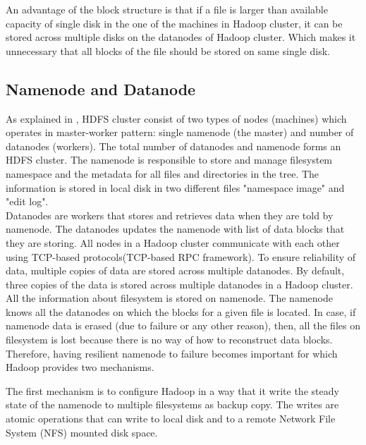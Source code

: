   An advantage of the block structure is that if a file is larger than available capacity of single disk in the one of the machines in Hadoop cluster, it can be stored across multiple disks on the datanodes of Hadoop cluster. Which makes it unnecessary that all blocks of the file should be stored on same single disk. 



\subsection{Namenode and Datanode}

 As explained in \cite{tom3}, HDFS cluster consist of two types of nodes (machines) which operates in master-worker pattern: single namenode (the master) and number of datanodes (workers). The total number of datanodes and namenode forms an HDFS cluster. The namenode is responsible to store and manage filesystem namespace and the metadata for all files and directories in the tree. The information is stored in local disk in two different files "namespace image" and "edit log".\\

  Datanodes are workers that stores and retrieves data when they are told by namenode. The datanodes updates the namenode with list of data blocks that they are storing. All nodes in a Hadoop cluster communicate with each other using TCP-based protocols(TCP-based RPC‌ framework). To ensure reliability of data, multiple copies of data are stored across multiple datanodes. By default, three copies of the data is stored across multiple datanodes in a Hadoop cluster.\\
   

All the information about filesystem is stored on namenode. The namenode knows all the datanodes on which the blocks for a given file is located. In case, if namenode data is erased (due to failure or any other reason), then, all the files on filesystem is lost because there is no way of how to reconstruct data blocks. Therefore, having resilient namenode to failure becomes important for which Hadoop provides two mechanisms.
 

 The first mechanism is to configure Hadoop in a way that it write the steady state of the namenode to multiple filesystems as backup copy. The writes are atomic operations that can write to local disk and to a remote Network File System (NFS) mounted disk space.


